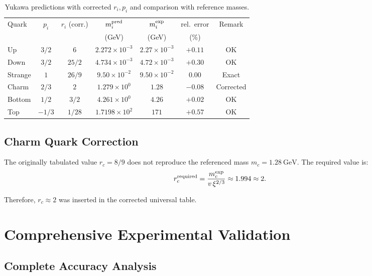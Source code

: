 \documentclass[12pt,a4paper]{article}
\begin{document}
	\begin{table}[h!]
		\centering
		\begin{tabular}{lcccccc}
			\toprule
			Quark & $p_i$ & $r_i$ (corr.) & $m_i^{\rm pred}$ & $m_i^{\rm exp}$ & rel.\ error & Remark\\
			& & & (GeV) & (GeV) & (\%) & \\
			\midrule
			Up     & $3/2$ & $6$        & $2.272\times10^{-3}$ & $2.27\times10^{-3}$ & $+0.11$ & OK \\
			Down   & $3/2$ & $25/2$     & $4.734\times10^{-3}$ & $4.72\times10^{-3}$ & $+0.30$ & OK \\
			Strange& $1$   & $26/9$        & $9.50\times10^{-2}$  & $9.50\times10^{-2}$  & $0.00$ & Exact\\
			Charm  & $2/3$ & $2$      & $1.279\times10^{0}$  & $1.28$              & $-0.08$ & Corrected\\
			Bottom & $1/2$ & $3/2$      & $4.261\times10^{0}$   & $4.26$              & $+0.02$ & OK \\
			Top    & $-1/3$& $1/28$     & $1.7198\times10^{2}$  & $171$               & $+0.57$ & OK \\
			\bottomrule
		\end{tabular}
		\caption{Yukawa predictions with corrected $r_i,p_i$ and comparison with reference masses.}
	\end{table}
	
	\subsection{Charm Quark Correction}
	\label{subsec:charm_correction}
	
	The originally tabulated value $r_c=8/9$ does not reproduce the referenced mass $m_c=1.28\ \mathrm{GeV}$. The required value is:
	\[
	r_c^{\rm required}=\frac{m_c^{\rm exp}}{v\,\xi^{2/3}}\approx 1.994 \approx 2.
	\]
	
	Therefore, $r_c \approx 2$ was inserted in the corrected universal table.
	
	\section{Comprehensive Experimental Validation}
	\label{sec:comprehensive_validation}
	
	\subsection{Complete Accuracy Analysis}
	\label{subsec:complete_accuracy}
	
\end{document}
